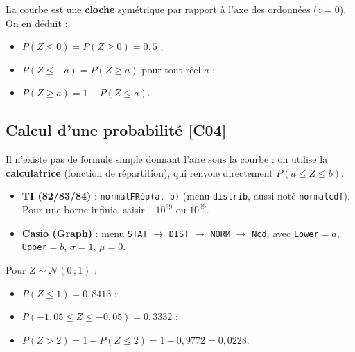 \documentclass[a4paper,11pt]{article}
\begin{document}
\begin{theoreme}
La courbe est une \textbf{cloche} symétrique par rapport à l'axe des ordonnées ($z=0$). On en déduit :
\begin{itemize}
  \item $P(Z \leq 0) = P(Z \geq 0) = 0{,}5$ ;
  \item $P(Z \leq -a) = P(Z \geq a)$ pour tout réel $a$ ;
  \item $P(Z \geq a) = 1 - P(Z \leq a)$.
\end{itemize}
\end{theoreme}

\subsection{Calcul d'une probabilité \hfill {\normalsize\color{uimmred}[C04]}}

Il n'existe pas de formule simple donnant l'aire sous la courbe : on utilise la \textbf{calculatrice} (fonction de répartition), qui renvoie directement $P(a \leq Z \leq b)$.

\begin{calculatrice}
\begin{itemize}
  \item \textbf{TI (82/83/84)} : \texttt{normalFRép(a, b)} \; (menu \texttt{distrib}, aussi noté \texttt{normalcdf}).
  Pour une borne infinie, saisir $-10^{99}$ ou $10^{99}$.
  \item \textbf{Casio (Graph)} : menu \texttt{STAT} $\rightarrow$ \texttt{DIST} $\rightarrow$ \texttt{NORM} $\rightarrow$ \texttt{Ncd}, avec \texttt{Lower}$=a$, \texttt{Upper}$=b$, $\sigma=1$, $\mu=0$.
\end{itemize}
\end{calculatrice}

\begin{exemple}
Pour $Z \sim \mathcal{N}(0\,;1)$ :
\begin{itemize}
  \item $P(Z \leq 1) = 0{,}8413$ ;
  \item $P(-1{,}05 \leq Z \leq -0{,}05) = 0{,}3332$ ;
  \item $P(Z > 2) = 1 - P(Z \leq 2) = 1 - 0{,}9772 = 0{,}0228$.
\end{itemize}
\end{exemple}
\end{document}
